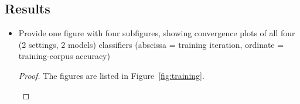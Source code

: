 \documentclass[12pt]{article}
\newcommand{\1}{\mathbf{1}}
\begin{document}
{\subsection{Results}
\begin{itemize}
  \item Provide one figure with four subfigures, showing convergence plots of all four (2 settings, 2 models) classifiers (abscissa = training iteration, ordinate = training-corpus accuracy)
  \begin{proof}
    The figures are listed in Figure~\ref{fig:training}.
    \begin{figure}
      \centering
\end{figure}
\end{proof}
\end{itemize}}
\end{document}
